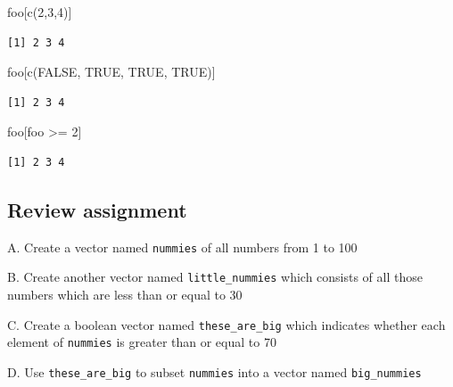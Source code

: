 \documentclass[
]{book}
\newenvironment{Shaded}{\begin{snugshade}}{\end{snugshade}}
\newcommand{\ConstantTok}[1]{\textcolor[rgb]{0.00,0.00,0.00}{#1}}
\newcommand{\DecValTok}[1]{\textcolor[rgb]{0.00,0.00,0.81}{#1}}
\newcommand{\FunctionTok}[1]{\textcolor[rgb]{0.00,0.00,0.00}{#1}}
\newcommand{\NormalTok}[1]{#1}
\newcommand{\SpecialCharTok}[1]{\textcolor[rgb]{0.00,0.00,0.00}{#1}}
\begin{document}
\begin{Shaded}
\begin{Highlighting}[]
\NormalTok{foo[}\FunctionTok{c}\NormalTok{(}\DecValTok{2}\NormalTok{,}\DecValTok{3}\NormalTok{,}\DecValTok{4}\NormalTok{)]}
\end{Highlighting}
\end{Shaded}

\begin{verbatim}
[1] 2 3 4
\end{verbatim}

\begin{Shaded}
\begin{Highlighting}[]
\NormalTok{foo[}\FunctionTok{c}\NormalTok{(}\ConstantTok{FALSE}\NormalTok{, }\ConstantTok{TRUE}\NormalTok{, }\ConstantTok{TRUE}\NormalTok{, }\ConstantTok{TRUE}\NormalTok{)]}
\end{Highlighting}
\end{Shaded}

\begin{verbatim}
[1] 2 3 4
\end{verbatim}

\begin{Shaded}
\begin{Highlighting}[]
\NormalTok{foo[foo }\SpecialCharTok{\textgreater{}=} \DecValTok{2}\NormalTok{]}
\end{Highlighting}
\end{Shaded}

\begin{verbatim}
[1] 2 3 4
\end{verbatim}

\hypertarget{review-assignment-5}{%
\subsection*{Review assignment}\label{review-assignment-5}}

A. Create a vector named \texttt{nummies} of all numbers from 1 to 100

B. Create another vector named \texttt{little\_nummies} which consists of all those numbers which are less than or equal to 30

C. Create a boolean vector named \texttt{these\_are\_big} which indicates whether each element of \texttt{nummies} is greater than or equal to 70

D. Use \texttt{these\_are\_big} to subset \texttt{nummies} into a vector named \texttt{big\_nummies}
\end{document}
